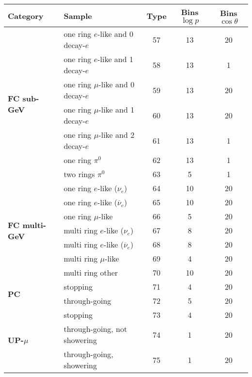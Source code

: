 \documentclass[a4paper, 11pt]{article}
\newcommand{\cj}{\overline}
\begin{document}
\begin{center}
	\scriptsize
	\begin{tabular}{llccc}
		\toprule
		Category	&	Sample	&	Type	& Bins $\log p$	& Bins $\cos\theta$  \\
		\midrule
		\multirow{7}{*}{\bf FC sub-GeV}	& one ring $e$-like and 0 decay-$e$	& 57 & 13 & 20 \\
						& one ring $e$-like and 1 decay-$e$	& 58 & 13 & 1 \\
						& one ring $\mu$-like and 0 decay-$e$	& 59 & 13 & 20 \\
						& one ring $\mu$-like and 1 decay-$e$	& 60 & 13 & 20\\
						& one ring $\mu$-like and 2 decay-$e$	& 61 & 13 & 1 \\
						& one ring $\pi^0$			& 62 & 13 & 1 \\
						& two rings $\pi^0$			& 63 & 5 & 1 \\
		\midrule
		\multirow{7}{*}{\bf FC multi-GeV}& one ring $e$-like ($\nu_e$) 		& 64 & 10 & 20 \\
						& one ring $e$-like ($\cj{\nu}_e$) 	& 65 & 10 & 20 \\
						& one ring $\mu$-like           	& 66 & 5 & 20 \\
						& multi ring $e$-like ($\nu_e$) 	& 67 & 8 & 20 \\
						& multi ring $e$-like ($\cj{\nu}_e$) 	& 68 & 8 & 20 \\
						& multi ring $\mu$-like	        	& 69 & 4 & 20 \\
						& multi ring other			& 70 & 10 & 20 \\
		\midrule
		\multirow{2}{*}{\bf PC}		& stopping 			& 71 & 4 & 20 \\
						& through-going 		& 72 & 5 & 20 \\
		\midrule
		\multirow{3}{*}{\bf UP-$\mu$}	& stopping 			& 73 & 4 & 20 \\
						& through-going, not showering 	& 74 & 1 & 20 \\
						& through-going, showering 	& 75 & 1 & 20 \\
		\bottomrule
	\end{tabular}
\end{center}
\end{document}

